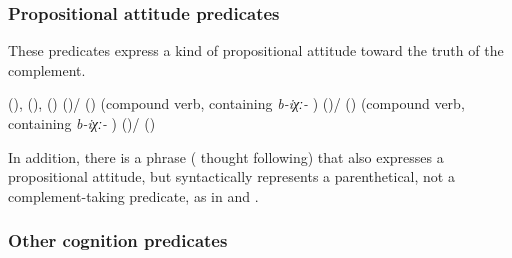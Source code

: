 
\subsubsection{Propositional attitude predicates}
\label{sssec:Propositional attitude predicates}

These predicates express a kind of propositional attitude toward the truth of the complement.
%
\begin{exe}
	\ex	\label{ex:propositional attitude predicates}
	\begin{xlist}
		\ex	{} (),  (),  () 
		\ex	{} 
		\ex	{} ()\slash{} ()  (compound verb, containing \textit{b-iχː-} )
		\ex	{} ()\slash{} ()  (compound verb, containing \textit{b-iχː-} )
		\ex	{} ()\slash{} () 
	\end{xlist}
\end{exe}

In addition, there is a phrase  ( thought following)  that also expresses a propositional attitude, but syntactically represents a parenthetical, not a complement-taking predicate, as in  and .



\subsubsection{Other cognition predicates}
\label{sssec:Other cognition predicates}


